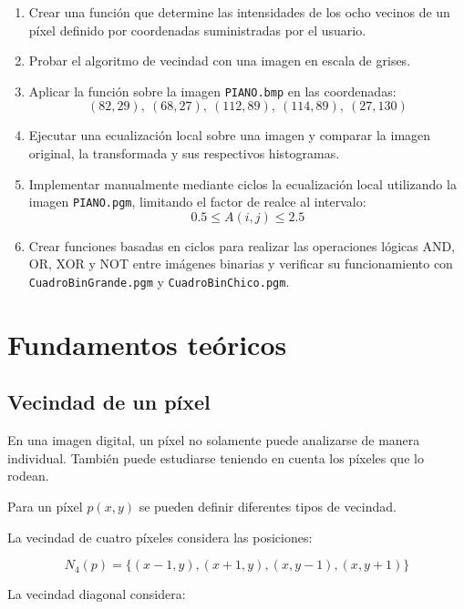 \documentclass[11pt,letterpaper]{article}
\begin{document}
\begin{enumerate}
    \item Crear una función que determine las intensidades de los ocho vecinos de un píxel definido por coordenadas suministradas por el usuario.
    
    \item Probar el algoritmo de vecindad con una imagen en escala de grises.
    
    \item Aplicar la función sobre la imagen \texttt{PIANO.bmp} en las coordenadas:
    \[
    (82,29),\ (68,27),\ (112,89),\ (114,89),\ (27,130)
    \]
    
    \item Ejecutar una ecualización local sobre una imagen y comparar la imagen original, la transformada y sus respectivos histogramas.
    
    \item Implementar manualmente mediante ciclos la ecualización local utilizando la imagen \texttt{PIANO.pgm}, limitando el factor de realce al intervalo:
    \[
    0.5 \leq A(i,j) \leq 2.5
    \]
    
    \item Crear funciones basadas en ciclos para realizar las operaciones lógicas AND, OR, XOR y NOT entre imágenes binarias y verificar su funcionamiento con \texttt{CuadroBinGrande.pgm} y \texttt{CuadroBinChico.pgm}.
\end{enumerate}


\section{Fundamentos teóricos}

\subsection{Vecindad de un píxel}

En una imagen digital, un píxel no solamente puede analizarse de manera individual. También puede estudiarse teniendo en cuenta los píxeles que lo rodean.

Para un píxel $p(x,y)$ se pueden definir diferentes tipos de vecindad.

La vecindad de cuatro píxeles considera las posiciones:

\[
N_4(p)=
\{
(x-1,y),
(x+1,y),
(x,y-1),
(x,y+1)
\}
\]

La vecindad diagonal considera:
\end{document}
